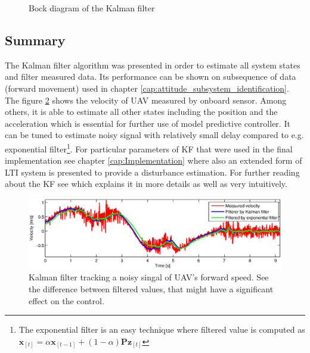 \begin{figure}
\caption{Bock diagram of the Kalman filter}
\label{fig:kalman_diagram}
\end{figure}

\subsection{Summary}

The Kalman filter algorithm was presented in order to estimate all system states and filter measured data. Its performance can be shown on subsequence of data (forward movement) used in chapter \ref{cap:attitude_subsystem_identification}. The figure \ref{fig:kalman1} shows the velocity of UAV measured by onboard sensor. Among others, it is able to estimate all other states including the position and the acceleration which is essential for further use of model predictive controller. It can be tuned to estimate noisy signal with relatively small delay compared to e.g. exponential filter\footnote{The exponential filter is an easy technique where filtered value is computed as $\textbf{\^x}_{[t]} = \alpha\textbf{\^x}_{[t-1]} + (1-\alpha)\textbf{P}\textbf{z}_{[t]}$}. For particular parameters of KF that were used in the final implementation see chapter \ref{cap:Implementation} where also an extended form of LTI system is presented to provide a disturbance estimation. For further reading about the KF see \citep{faragher2012understandingKF} which explains it in more details as well as very intuitively.

\begin{figure}[h]
\includegraphics[width=1\textwidth]{fig/kalman1.eps} 
\caption{Kalman filter tracking a noisy singal of UAV's forward speed. See the difference between filtered values, that might have a significant effect on the control.}
\label{fig:kalman1}
\end{figure}
